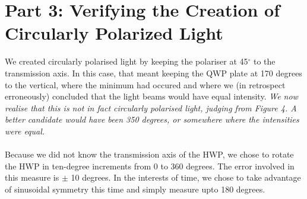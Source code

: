 \documentclass[10pt,a4paper]{article}
\begin{document}
\section*{Part 3: Verifying the Creation of Circularly Polarized Light}
We created circularly polarised light by keeping the polariser at 45$^{\circ}$ to the transmission axis. In this case, that meant keeping the QWP plate at 170 degrees to the vertical, where the minimum had occured and where we (in retrospect erroneously) concluded that the light beams would have equal intensity. \textit{We now realise that this is not in fact circularly polarised light, judging from Figure 4. A better candidate would have been 350 degrees, or somewhere where the intensities were equal.}\\
\\
Because we did not know the transmission axis of the HWP, we chose to rotate the HWP in ten-degree increments from 0 to 360 degrees. The error involved in this measure is $\pm$ 10 degrees. In the interests of time, we chose to take advantage of sinusoidal symmetry this time and simply measure upto 180 degrees.
\end{document}
